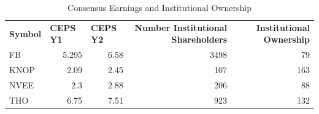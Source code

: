 \documentclass{article}
\begin{document}
\begin{table}[htbp]
  \caption{Consensus Earnings and Institutional Ownership}
    \begin{tabular}{lrrrr}
    \textbf{Symbol} & \multicolumn{1}{l}{\textbf{CEPS Y1}} & \multicolumn{1}{l}{\textbf{CEPS Y2}} & \multicolumn{1}{p{4.215em}}{\textbf{Number Institutional Shareholders}} & \multicolumn{1}{p{4.215em}}{\textbf{Institutional Ownership}} \\
    FB    & 5.295 & 6.58  & 3498  & 79 \\
    KNOP  & 2.09  & 2.45  & 107   & 163 \\
    NVEE  & 2.3   & 2.88  & 206   & 88 \\
    THO   & 6.75  & 7.51  & 923   & 132 \\
    \end{tabular}%
  \label{tab:addlabel}%
\end{table}%
\end{document}
